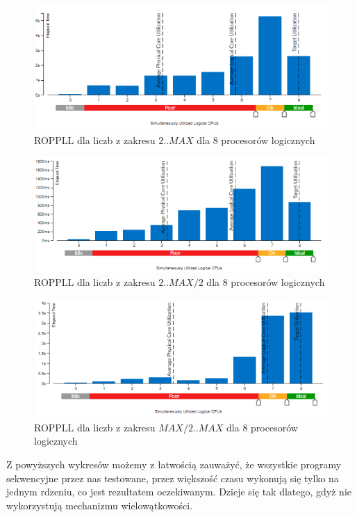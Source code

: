 \documentclass{article}
\begin{document}
                \begin{figure}[H]
                    \includegraphics[width=13cm]{rownolegly_funcion_bezsita8_2_MAX}
                    \caption{\gls{ROPPLL} dla liczb z zakresu $2 .. MAX$ dla 8 procesorów logicznych}
                \end{figure}
                \begin{figure}[H]
                    \includegraphics[width=13cm]{rownolegly_funcion_bezsita8_2_MAX2}
                    \caption{\gls{ROPPLL} dla liczb z zakresu $2 .. MAX / 2$ dla 8 procesorów logicznych}
                \end{figure}
                \begin{figure}[H]
                    \includegraphics[width=13cm]{rownolegly_funcion_bezsita8_MAX2_MAX}
                    \caption{\gls{ROPPLL} dla liczb z zakresu $MAX / 2 .. MAX$ dla 8 procesorów logicznych}
                \end{figure}
            Z powyższych wykresów możemy z łatwością zauważyć, że wszystkie programy sekwencyjne przez nas testowane, przez większość czasu wykonują się tylko na jednym rdzeniu, co jest rezultatem oczekiwanym. Dzieje się tak dlatego, gdyż nie wykorzystują mechanizmu wielowątkowości.
            
\end{document}
